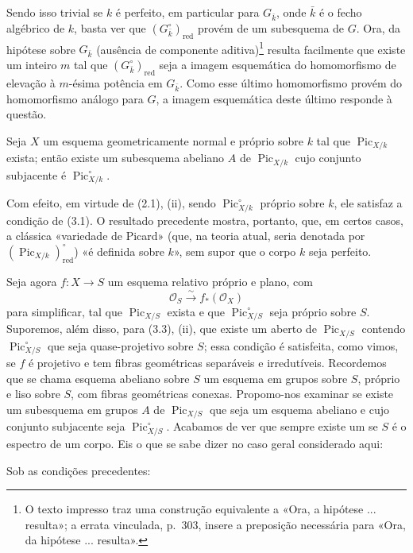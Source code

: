 Sendo isso trivial se $k$ é perfeito, em particular para $G_{\bar k}$, onde
$\bar k$ é o fecho algébrico de $k$, basta ver que
$(G_{\bar k}^\circ)_{\mathrm{red}}$ provém de um subesquema de $G$. Ora, da
hipótese sobre $G_{\bar k}$ (ausência de componente aditiva)\footnote{O texto
impresso traz uma construção equivalente a «Ora, a hipótese ... resulta»; a
errata vinculada, p.~303, insere a preposição necessária para «Ora, da hipótese
... resulta».} resulta facilmente que existe um inteiro $m$ tal que
$(G_{\bar k}^\circ)_{\mathrm{red}}$ seja a imagem esquemática do homomorfismo de
elevação à $m$-ésima potência em $G_{\bar k}$. Como esse último homomorfismo
provém do homomorfismo análogo para $G$, a imagem esquemática deste último
responde à questão.

 Seja $X$ um esquema geometricamente normal e próprio sobre $k$ tal que
$\operatorname{Pic}_{X/k}$ exista; então existe um subesquema abeliano $A$ de
$\operatorname{Pic}_{X/k}$ cujo conjunto subjacente é
$\operatorname{Pic}_{X/k}^\circ$.

Com efeito, em virtude de (2.1), (ii), sendo
$\operatorname{Pic}_{X/k}^\circ$ próprio sobre $k$, ele satisfaz a condição de
(3.1).
O resultado precedente mostra, portanto, que, em certos casos, a clássica
«variedade de Picard» (que, na teoria atual, seria denotada por
$(\operatorname{Pic}_{X/k})_{\mathrm{red}}^\circ$) «é definida sobre $k$»,
sem supor que o corpo $k$ seja perfeito.

Seja agora $f:X\longrightarrow S$ um esquema relativo próprio e plano, com
\[
\mathcal O_S\xrightarrow{\sim}f_*(\mathcal O_X)
\]
para simplificar, tal que $\operatorname{Pic}_{X/S}$ exista e que
$\operatorname{Pic}_{X/S}^\circ$ seja próprio sobre $S$. Suporemos, além
disso, para (3.3), (ii), que existe um aberto de $\operatorname{Pic}_{X/S}$
contendo $\operatorname{Pic}_{X/S}^\circ$ que seja quase-projetivo sobre $S$;
essa condição é satisfeita, como vimos, se $f$ é projetivo e tem fibras
geométricas separáveis e irredutíveis. Recordemos que se chama esquema
abeliano sobre $S$ um esquema em grupos sobre $S$, próprio e liso sobre
$S$, com fibras geométricas conexas. Propomo-nos
examinar se existe um subesquema em grupos $A$ de
$\operatorname{Pic}_{X/S}$ que seja um esquema abeliano e cujo conjunto
subjacente seja $\operatorname{Pic}_{X/S}^\circ$. Acabamos de ver que sempre
existe um se $S$ é o espectro de um corpo. Eis o que se sabe dizer no caso
geral considerado aqui:

 Sob as condições precedentes:

